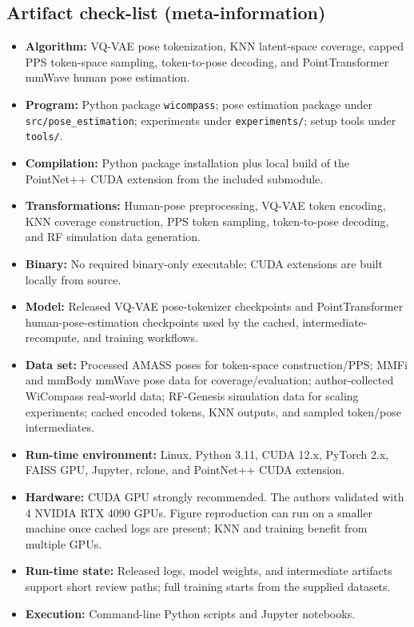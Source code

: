 \documentclass{sigplanconf}
\begin{document}
\subsection{Artifact check-list (meta-information)}
{\small
\begin{itemize}
\item \textbf{Algorithm:} VQ-VAE pose tokenization, KNN latent-space coverage, capped PPS token-space sampling, token-to-pose decoding, and PointTransformer mmWave human pose estimation.
\item \textbf{Program:} Python package \texttt{wicompass}; pose estimation package under \texttt{src/pose\_estimation}; experiments under \texttt{experiments/}; setup tools under \texttt{tools/}.
\item \textbf{Compilation:} Python package installation plus local build of the PointNet++ CUDA extension from the included submodule.
\item \textbf{Transformations:} Human-pose preprocessing, VQ-VAE token encoding, KNN coverage construction, PPS token sampling, token-to-pose decoding, and RF simulation data generation.
\item \textbf{Binary:} No required binary-only executable; CUDA extensions are built locally from source.
\item \textbf{Model:} Released VQ-VAE pose-tokenizer checkpoints and PointTransformer human-pose-estimation checkpoints used by the cached, intermediate-recompute, and training workflows.
\item \textbf{Data set:} Processed AMASS poses for token-space construction/PPS; MMFi and mmBody mmWave pose data for coverage/evaluation; author-collected WiCompass real-world data; RF-Genesis simulation data for scaling experiments; cached encoded tokens, KNN outputs, and sampled token/pose intermediates.
\item \textbf{Run-time environment:} Linux, Python 3.11, CUDA 12.x, PyTorch 2.x, FAISS GPU, Jupyter, rclone, and PointNet++ CUDA extension.
\item \textbf{Hardware:} CUDA GPU strongly recommended. The authors validated with 4 NVIDIA RTX 4090 GPUs. Figure reproduction can run on a smaller machine once cached logs are present; KNN and training benefit from multiple GPUs.
\item \textbf{Run-time state:} Released logs, model weights, and intermediate artifacts support short review paths; full training starts from the supplied datasets.
\item \textbf{Execution:} Command-line Python scripts and Jupyter notebooks.

\end{itemize}}
\end{document}
